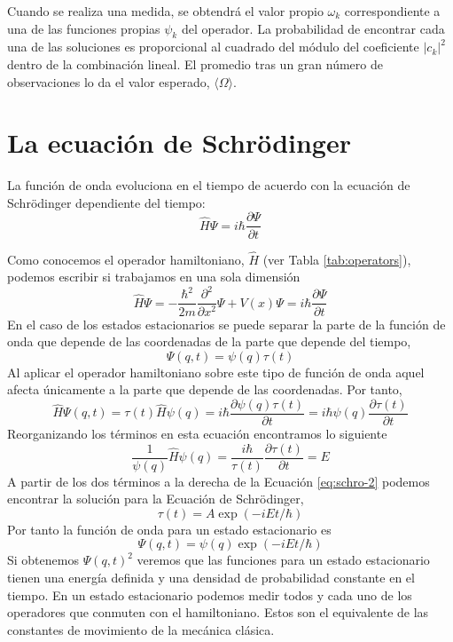 Cuando se realiza una medida, se obtendrá el valor 
propio $\omega_k$ correspondiente a una de las funciones
propias $\psi_k$ del operador. La probabilidad de
encontrar cada una de las soluciones es proporcional
al cuadrado del módulo  del coeficiente $|c_k|^2$ dentro
de la combinación lineal. El promedio tras un gran número
de observaciones lo da el valor esperado, $\langle
\Omega\rangle$.



\section{La ecuación de Schrödinger}
\begin{theorem}
La función de onda evoluciona en el tiempo de acuerdo 
con la ecuación de Schrödinger dependiente del tiempo:
\begin{equation}
    \hat{H}\Psi = i\hbar\frac{\partial \Psi}{\partial t}
\end{equation}
\end{theorem}
Como conocemos el operador hamiltoniano, $\hat{H}$ (ver
Tabla \ref{tab:operators}), podemos escribir si trabajamos
en una sola dimensión
\begin{equation}
    \hat{H}\Psi = 
      -\frac{\hbar^2}{2m}\frac{\partial^2}{\partial x^2}\Psi + V(x)\Psi = i\hbar\frac{\partial \Psi}{\partial t}
\end{equation}
En el caso de los estados estacionarios 
se puede separar la parte de la función de onda
que depende de las coordenadas de la parte que 
depende del tiempo,
\begin{equation}
    \Psi(q,t)=\psi(q)\tau(t)
\end{equation}
Al aplicar el operador hamiltoniano 
sobre este tipo de función de onda
aquel afecta únicamente a la parte
que depende de las coordenadas. Por
tanto,
\begin{equation}
    \hat{H}\Psi(q,t)=
    \tau(t)\hat{H}\psi(q)=
    i\hbar\frac{\partial\psi(q)\tau(t)}{\partial t}=
    i\hbar\psi(q)\frac{\partial \tau(t)}{\partial t}
\end{equation}
Reorganizando los términos en esta ecuación encontramos
lo siguiente
\begin{equation}
    \frac{1}{\psi(q)}\hat{H}\psi(q) = \frac{i\hbar}{\tau(t)}\frac{\partial \tau(t)}{\partial t}= E
    \label{eq:schro-2}
\end{equation}
A partir de los dos términos a la derecha de la Ecuación
\ref{eq:schro-2} podemos encontrar la solución para la
Ecuación de Schrödinger,
\begin{equation}
    \tau(t)=A\exp(-iEt/\hbar)
\end{equation}
Por tanto la función de onda para un estado estacionario
es
\begin{equation}
    \Psi(q,t)=\psi(q)\exp(-iEt/\hbar)
\end{equation}
Si obtenemos $\Psi(q,t)^2$ veremos que las funciones para un
estado estacionario tienen una energía definida 
y una densidad de probabilidad constante en el tiempo.
En un estado estacionario podemos medir todos y cada uno de los 
operadores que conmuten con el hamiltoniano. Estos son el 
equivalente de las constantes de movimiento de la mecánica clásica.

